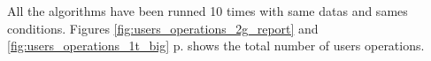 All the algorithms have been runned 10 times with same datas and sames conditions. Figures \ref{fig:users_operations_2g_report} and \ref{fig:users_operations_1t_big} p.\pageref{fig:users_operations_2g_report} shows the total number of users operations.


